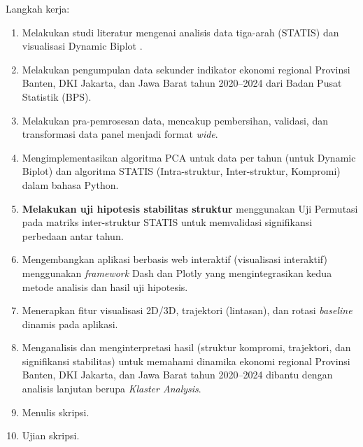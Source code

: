 \documentclass[a4paper]{article}
\theoremstyle{definition} %
\begin{document}
Langkah kerja:
\begin{enumerate}
	\item Melakukan studi literatur mengenai analisis data tiga-arah (STATIS) \citet{lavit94, oliveira2024} dan visualisasi Dynamic Biplot \citet{egido2015}.
	\item Melakukan pengumpulan data sekunder indikator ekonomi regional Provinsi Banten, DKI Jakarta, dan Jawa Barat tahun 2020--2024 dari Badan Pusat Statistik (BPS).
	\item Melakukan pra-pemrosesan data, mencakup pembersihan, validasi, dan transformasi data panel menjadi format \textit{wide}.
	\item Mengimplementasikan algoritma PCA untuk data per tahun (untuk Dynamic Biplot) dan algoritma STATIS (Intra-struktur, Inter-struktur, Kompromi) dalam bahasa Python.
    \item \textbf{Melakukan uji hipotesis stabilitas struktur} menggunakan Uji Permutasi pada matriks inter-struktur STATIS \citet{kazi1995} untuk memvalidasi signifikansi perbedaan antar tahun.
	\item Mengembangkan aplikasi berbasis web interaktif (visualisasi interaktif) menggunakan \textit{framework} Dash dan Plotly yang mengintegrasikan kedua metode analisis dan hasil uji hipotesis.
	\item Menerapkan fitur visualisasi 2D/3D, trajektori (lintasan), dan rotasi \textit{baseline} dinamis pada aplikasi.
	\item Menganalisis dan menginterpretasi hasil (struktur kompromi, trajektori, dan signifikansi stabilitas) untuk memahami dinamika ekonomi regional Provinsi Banten, DKI Jakarta, dan Jawa Barat tahun 2020--2024 dibantu dengan analisis lanjutan berupa \textit{Klaster Analysis}.
	\item Menulis skripsi.
	\item Ujian skripsi.
\end{enumerate}
\end{document}
